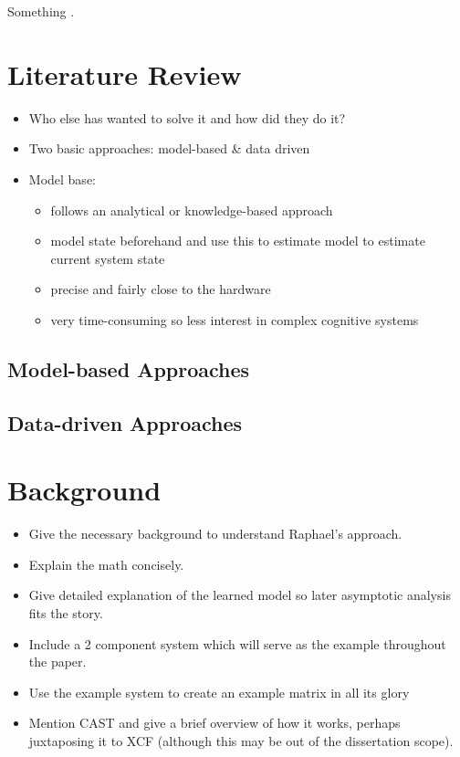 \documentclass[11pt, a4paper]{report}
\begin{document}
Something \cite{Antonelo2008}.
\chapter{Literature Review}
\label{cha:lit-review}

\begin{itemize}
\item Who else has wanted to solve it and how did they do it?
\item Two basic approaches: model-based \& data driven
\item Model base:
  \begin{itemize}
  \item follows an analytical or knowledge-based approach
  \item model state beforehand and use this to estimate model to
    estimate current system state
  \item precise and fairly close to the hardware
  \item very time-consuming so less interest in complex cognitive
    systems
  \end{itemize}
\end{itemize}

\section{Model-based Approaches}
\section{Data-driven Approaches}

\chapter{Background}\label{cha:background}

\begin{itemize}
\item Give the necessary background to understand Raphael's approach.
\item Explain the math concisely.
\item Give detailed explanation of the learned model so later
  asymptotic analysis fits the story.
\item Include a 2 component system which will serve as the example
  throughout the paper.
\item Use the example system to create an example matrix in all its
  glory
\item Mention CAST and give a brief overview of how it works, perhaps
  juxtaposing it to XCF (although this may be out of the dissertation
  scope).
\end{itemize}
\end{document}
